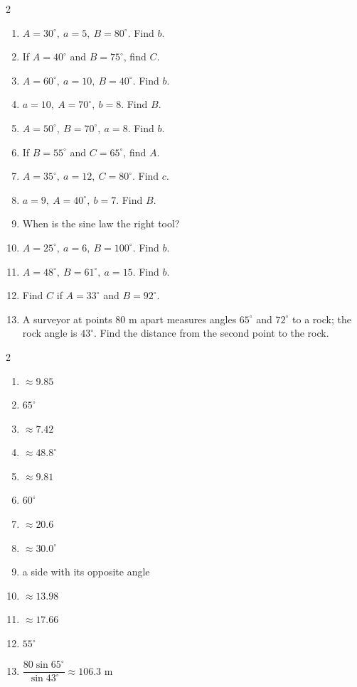\documentclass[11pt]{article}
\begin{document}
\begin{recapbox}
\begin{multicols}{2}
\small
\begin{enumerate}[leftmargin=*,itemsep=3pt]
  \item $A=30^\circ,\ a=5,\ B=80^\circ$. Find $b$.
  \item If $A=40^\circ$ and $B=75^\circ$, find $C$.
  \item $A=60^\circ,\ a=10,\ B=40^\circ$. Find $b$.
  \item $a=10,\ A=70^\circ,\ b=8$. Find $B$.
  \item $A=50^\circ,\ B=70^\circ,\ a=8$. Find $b$.
  \item If $B=55^\circ$ and $C=65^\circ$, find $A$.
  \item $A=35^\circ,\ a=12,\ C=80^\circ$. Find $c$.
  \item $a=9,\ A=40^\circ,\ b=7$. Find $B$.
  \item When is the sine law the right tool?
  \item $A=25^\circ,\ a=6,\ B=100^\circ$. Find $b$.
  \item $A=48^\circ,\ B=61^\circ,\ a=15$. Find $b$.
  \item Find $C$ if $A=33^\circ$ and $B=92^\circ$.
  \item A surveyor at points $80$ m apart measures angles $65^\circ$ and $72^\circ$ to a rock; the rock angle is $43^\circ$. Find the distance from the second point to the rock.
\end{enumerate}
\end{multicols}
\end{recapbox}

\begin{keybox}
\begin{multicols}{2}
\small
\begin{enumerate}[leftmargin=*,itemsep=3pt]
  \item $\approx9.85$
  \item $65^\circ$
  \item $\approx7.42$
  \item $\approx48.8^\circ$
  \item $\approx9.81$
  \item $60^\circ$
  \item $\approx20.6$
  \item $\approx30.0^\circ$
  \item a side with its opposite angle
  \item $\approx13.98$
  \item $\approx17.66$
  \item $55^\circ$
  \item $\dfrac{80\sin65^\circ}{\sin43^\circ}\approx106.3$ m
\end{enumerate}
\end{multicols}
\end{keybox}
\end{document}
